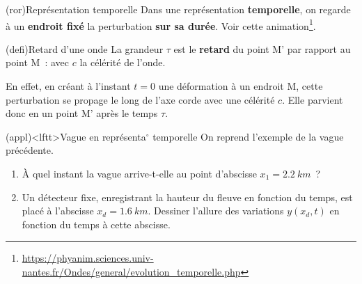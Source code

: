 \documentclass[../../main/main.tex]{subfiles}
\begin{document}
\begin{tcb}(ror){Représentation temporelle}
	Dans une représentation \textbf{temporelle}, on regarde à un
	\textbf{endroit fixé} la perturbation \textbf{sur sa durée}. Voir cette
	animation\footnote{\url{https://phyanim.sciences.univ-nantes.fr/Ondes/general/evolution_temporelle.php}}.
\end{tcb}

\begin{tcb}(defi){Retard d'une onde}
	La grandeur $\tau$ est le \textbf{retard} du point M' par rapport au point
	M~:
	\psw{%
		\[\tau = \frac{\rm MM'}{c}\]
	}%
	avec $c$ la célérité de l'onde.
\end{tcb}

En effet, en créant à l'instant $t = 0$ une déformation à un endroit M, cette
perturbation se propage le long de l'axe corde avec une célérité $c$. Elle
parvient donc en un point M' après le temps $\tau$.

\begin{tcb*}(appl)<lftt>{Vague en représenta$^\circ$ temporelle}
	On reprend l'exemple de la vague précédente.
	\begin{enumerate}
		\item À quel instant la vague arrive-t-elle au point d'abscisse $x_1 =
			      \SI{2.2}{km}$~?
		      \smallbreak
		      \vspace{-15pt}
		\item Un détecteur fixe, enregistrant la hauteur du fleuve en fonction
		      du temps, est placé à l'abscisse $x_d = \SI{1.6}{km}$. Dessiner
		      l'allure des variations $y(x_d,t)$ en fonction du temps à cette
		      abscisse.
		      \smallbreak
	\end{enumerate}
	\begin{center}
	\end{center}
\end{tcb*}
\end{document}
